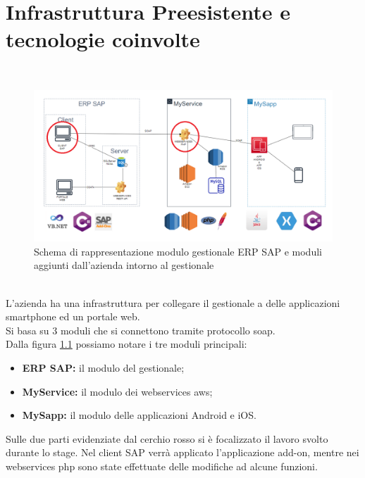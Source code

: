 
\chapter{Infrastruttura Preesistente e tecnologie coinvolte}
\label{cap:descrizione-architettura}

\\
\begin{figure}[!h] 
	\centering 
	\includegraphics[scale = 0.4]{immagini/obiettivi-stage.png} 
	\caption{Schema di rappresentazione modulo gestionale ERP SAP e moduli aggiunti dall'azienda intorno al gestionale}
	\label{fig:2-1}
\end{figure}\\
L'azienda ha una infrastruttura per collegare il gestionale a delle applicazioni smartphone ed un portale web. \\Si basa su 3 moduli che si connettono tramite protocollo \gls{soap}.
\\
Dalla figura \ref{fig:2-1} possiamo notare i tre moduli principali:
\begin{itemize}
	\item \textbf{ERP SAP:} il modulo del gestionale;
	\item \textbf{MyService:} il modulo dei webservices \gls{aws};
	\item \textbf{MySapp:} il modulo delle applicazioni Android e iOS.\\
\end{itemize}
Sulle due parti evidenziate dal cerchio rosso si è focalizzato il lavoro svolto durante lo stage.
Nel client SAP verrà applicato l'applicazione add-on, mentre nei webservices php sono state effettuate delle modifiche ad alcune funzioni.
